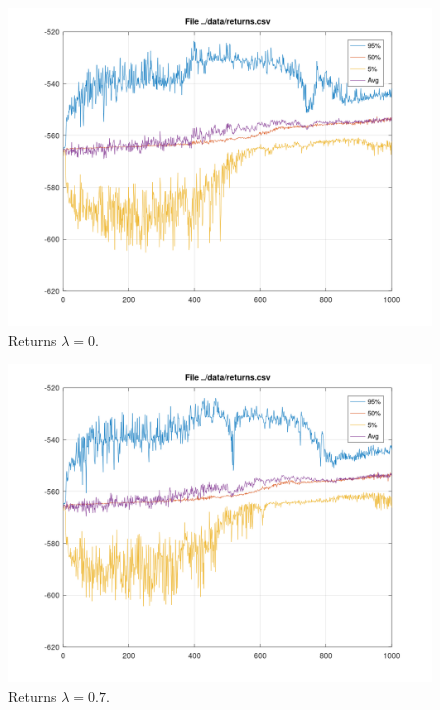 \documentclass[a4paper,11pt]{article}
\begin{document}
\begin{figure}
	\includegraphics[width=\linewidth]{returns-0.png}
	\caption{Returns $\lambda=0$.}
	\label{fig:returns0}
\end{figure}
\begin{figure}
	\includegraphics[width=\linewidth]{returns-07.png}
	\caption{Returns $\lambda=0.7$.}
	\label{fig:returns07}
\end{figure}
\end{document}

